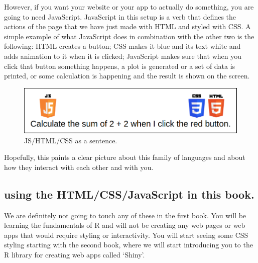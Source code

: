 \documentclass[]{book}
\begin{document}
However, if you want your website or your app to actually do something, you are going to need JavaScript. JavaScript in this setup is a verb that defines the actions of the page that we have just made with HTML and styled with CSS. A simple example of what JavaScript does in combination with the other two is the following: HTML creates a button; CSS makes it blue and its text white and adds animation to it when it is clicked; JavaScript makes sure that when you click that button something happens, a plot is generated or a set of data is printed, or some calculation is happening and the result is shown on the screen.

\begin{figure}
\centering
\includegraphics{jshtmlcss.png}
\caption{JS/HTML/CSS as a sentence.}
\end{figure}

Hopefully, this paints a clear picture about this family of languages and about how they interact with each other and with you.

\hypertarget{using-the-htmlcssjavascript-in-this-book.}{%
\subsection{using the HTML/CSS/JavaScript in this book.}\label{using-the-htmlcssjavascript-in-this-book.}}

We are definitely not going to touch any of these in the first book. You will be learning the fundamentals of R and will not be creating any web pages or web apps that would require styling or interactivity. You will start seeing some CSS styling starting with the second book, where we will start introducing you to the R library for creating web apps called `Shiny'.
\end{document}

